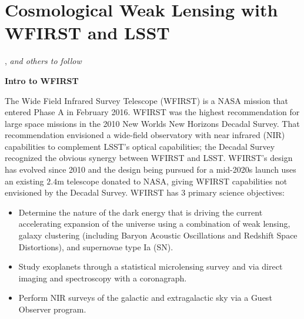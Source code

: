 %
%
%
%
%
%
%

\section{Cosmological Weak Lensing with WFIRST and LSST}
\def\secname{\chpname:weaklensing}\label{sec:\secname}




,
{\it and others to follow}

\textbf{Intro to WFIRST}

The Wide Field Infrared Survey Telescope (WFIRST) is a NASA mission that
entered Phase A in February 2016.  WFIRST was the highest recommendation
for large space missions in the 2010 New Worlds New Horizons Decadal
Survey.  That recommendation envisioned a wide-field observatory with
near infrared (NIR) capabilities to complement LSST's optical
capabilities; the Decadal Survey recognized the obvious synergy between
WFIRST and LSST.  WFIRST's design has evolved since 2010 and the design
being pursued for a mid-2020s launch uses an existing $2.4$m telescope
donated to NASA, giving WFIRST capabilities not envisioned by the
Decadal Survey.  WFIRST has 3 primary science objectives:

\begin{itemize}
\item Determine the nature of the dark energy that is driving the
current accelerating expansion of the universe using a combination of
weak lensing, galaxy clustering (including Baryon Acoustic Oscillations
and Redshift Space Distortions), and supernovae type Ia (SN).
\item Study exoplanets through a statistical microlensing survey and via
direct imaging and spectroscopy with a coronagraph.
\item Perform NIR surveys of the galactic and extragalactic sky via a
Guest Observer program.
\end{itemize}

